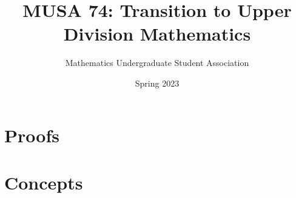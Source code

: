 \documentclass[openany]{book}
\title{MUSA 74: Transition to Upper Division Mathematics}
\author{Mathematics Undergraduate Student Association}
\date{Spring 2023}
\begin{document}


\part{Proofs}





\part{Concepts}




\nirprintbib
\nirprintindex
\end{document}
